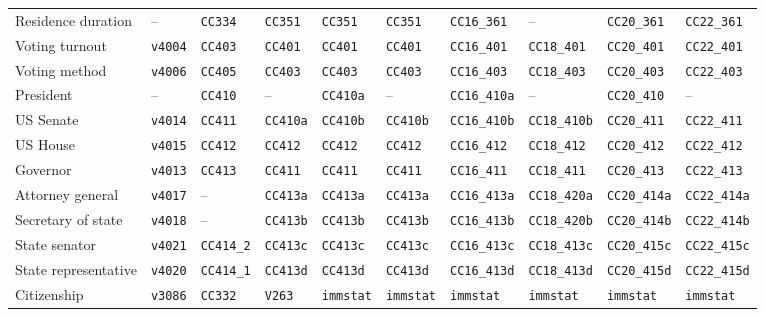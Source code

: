 \documentclass[12pt]{article}
\begin{document}
\begin{table}[htbp]
{\begin{tabular}{llllllllll}
Residence duration & -- & \texttt{CC334} & \texttt{CC351} & \texttt{CC351} & \texttt{CC351} & \texttt{CC16\_361} & -- & \texttt{CC20\_361} & \texttt{CC22\_361} \\
Voting turnout & \texttt{v4004} & \texttt{CC403} & \texttt{CC401} & \texttt{CC401} & \texttt{CC401} & \texttt{CC16\_401} & \texttt{CC18\_401} & \texttt{CC20\_401} & \texttt{CC22\_401} \\
Voting method & \texttt{v4006} & \texttt{CC405} & \texttt{CC403} & \texttt{CC403} & \texttt{CC403} & \texttt{CC16\_403} & \texttt{CC18\_403} & \texttt{CC20\_403} & \texttt{CC22\_403} \\
President & -- & \texttt{CC410} & -- & \texttt{CC410a} & -- & \texttt{CC16\_410a} & -- & \texttt{CC20\_410} & -- \\
US Senate & \texttt{v4014} & \texttt{CC411} & \texttt{CC410a} & \texttt{CC410b} & \texttt{CC410b} & \texttt{CC16\_410b} & \texttt{CC18\_410b} & \texttt{CC20\_411} & \texttt{CC22\_411} \\
US House & \texttt{v4015} & \texttt{CC412} & \texttt{CC412} & \texttt{CC412} & \texttt{CC412} & \texttt{CC16\_412} & \texttt{CC18\_412} & \texttt{CC20\_412} & \texttt{CC22\_412} \\
Governor & \texttt{v4013} & \texttt{CC413} & \texttt{CC411} & \texttt{CC411} & \texttt{CC411} & \texttt{CC16\_411} & \texttt{CC18\_411} & \texttt{CC20\_413} & \texttt{CC22\_413} \\
Attorney general & \texttt{v4017} & -- & \texttt{CC413a} & \texttt{CC413a} & \texttt{CC413a} & \texttt{CC16\_413a} & \texttt{CC18\_420a} & \texttt{CC20\_414a} & \texttt{CC22\_414a} \\
Secretary of state & \texttt{v4018} & -- & \texttt{CC413b} & \texttt{CC413b} & \texttt{CC413b} & \texttt{CC16\_413b} & \texttt{CC18\_420b} & \texttt{CC20\_414b} & \texttt{CC22\_414b} \\
State senator & \texttt{v4021} & \texttt{CC414\_2} & \texttt{CC413c} & \texttt{CC413c} & \texttt{CC413c} & \texttt{CC16\_413c} & \texttt{CC18\_413c} & \texttt{CC20\_415c} & \texttt{CC22\_415c} \\
State representative & \texttt{v4020} & \texttt{CC414\_1} & \texttt{CC413d} & \texttt{CC413d} & \texttt{CC413d} & \texttt{CC16\_413d} & \texttt{CC18\_413d} & \texttt{CC20\_415d} & \texttt{CC22\_415d} \\
\midrule
Citizenship & \texttt{v3086} & \texttt{CC332} & \texttt{V263} & \texttt{immstat} & \texttt{immstat} & \texttt{immstat} & \texttt{immstat} & \texttt{immstat} & \texttt{immstat} \\

\end{tabular}}
\end{table}
\end{document}
